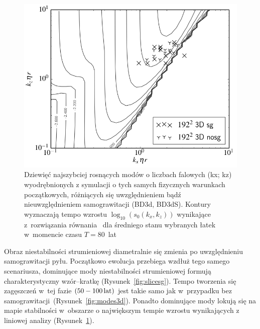 \begin{figure}[h]
   \centering
   \includegraphics[width=0.5\linewidth]{figures/3d_map_x3_50.png}
   \caption{
      Dziewięć najszybciej rosnących modów o liczbach falowych (kx; kz)
      wyodrębnionych z symulacji o tych samych fizycznych warunkach
      początkowych, różniących się uwzględnieniem bądź nieuwzględnieniem
      samograwitacji (BD3d, BD3dS).  Kontury wyznaczają tempo wzrostu
      $\log_{10}(s_0(k_x, k_z))$ wynikające z~rozwiązania równania~
       dla średniego stanu wybranych łatek w~momencie
      czasu $T = 80$~lat}
   \label{fig:map3d}
\end{figure}
\par Obraz niestabilności strumieniowej diametralnie się zmienia po
uwzględnieniu samograwitacji pyłu. Początkowo ewolucja przebiega wzdłuż tego
samego scenariusza, dominujące mody niestabilności strumieniowej formują
charakterystyczny wzór--kratkę (Rysunek~\ref{fig:slicesg}). Tempo tworzenia się
zagęszczeń w~tej fazie $(50 - 100\hbox{$\thinspace\textrm{lat}$})$ jest takie samo jak w~przypadku bez
samograwitacji~(Rysunek~\ref{fig:modes3d}). Ponadto dominujące mody lokują się
na mapie stabilności w~obszarze o największym tempie wzrostu wynikających z
liniowej analizy (Rysunek~\ref{fig:map3d}).
%
